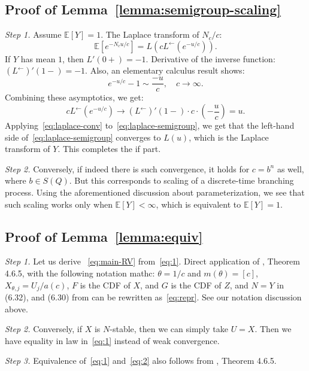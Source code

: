 \documentclass[12pt]{amsart}
\theoremstyle{remark}
\theoremstyle{definition}
\begin{document}
\subsection{Proof of Lemma~\ref{lemma:semigroup-scaling}} {\it Step 1.} Assume 
$\mathbb E[Y] = 1$. The Laplace transform of $N_c/c$:  
\begin{equation}
\label{eq:laplace-semigroup}
\mathbb E\left[e^{-N_cu/c}\right] = L\left(cL^{\leftarrow}\left(e^{-u/c}\right)\right).
\end{equation}
If $Y$ has mean $1$, then $L'(0+) = -1$. Derivative of the inverse function: $(L^{\leftarrow})'(1-) = -1$. Also, an elementary calculus result shows:
$$
e^{-u/c} - 1 \sim \frac{-u}{c},\quad c \to \infty.
$$
Combining these asymptotics, we get:
\begin{equation}
\label{eq:laplace-conv}
cL^{\leftarrow}\left(e^{-u/c}\right) \to (L^{\leftarrow})'(1-) \cdot c\cdot\left(-\frac{u}{c}\right) = u. 
\end{equation}
Applying~\eqref{eq:laplace-conv} to~\eqref{eq:laplace-semigroup}, we get that the left-hand side of~\eqref{eq:laplace-semigroup} converges to $L(u)$, which is the Laplace transform of $Y$. This completes the if part. 

{\it Step 2.} Conversely, if indeed there is such convergence, it holds for $c = b^n$ as well, where $b \in S(Q)$. But this corresponds to scaling of a discrete-time branching process. Using the aforementioned discussion about parameterization, we see that such  scaling works only when $\mathbb E[Y] < \infty$, which is equivalent to $\mathbb E[Y] = 1$. 

\subsection{Proof of Lemma~\ref{lemma:equiv}} {\it Step 1.} Let us derive ~\eqref{eq:main-RV} from~\eqref{eq:1}. Direct application of \cite[Chapter 4]{GnedenkoBook}, Theorem 4.6.5, with the following notation mathc: $\theta = 1/c$ and $m(\theta) = [c]$, $X_{\theta, j} = U_j/a(c)$, $F$ is the CDF of $X$, and $G$ is the CDF of $Z$, and $N = Y$ in (6.32), and (6.30) from \cite[Theorem 4.6.3]{GnedenkoBook} can be rewritten as~\eqref{eq:repr}. See our notation discussion above. 

{\it Step 2.} Conversely, if $X$ is $N$-stable, then we can simply take $U = X$. Then we have equality in law in~\eqref{eq:1} instead of weak convergence. 

{\it Step 3.} Equivalence of~\eqref{eq:1} and~\eqref{eq:2} also follows from \cite[Chapter 4]{GnedenkoBook}, Theorem 4.6.5.
\end{document}
